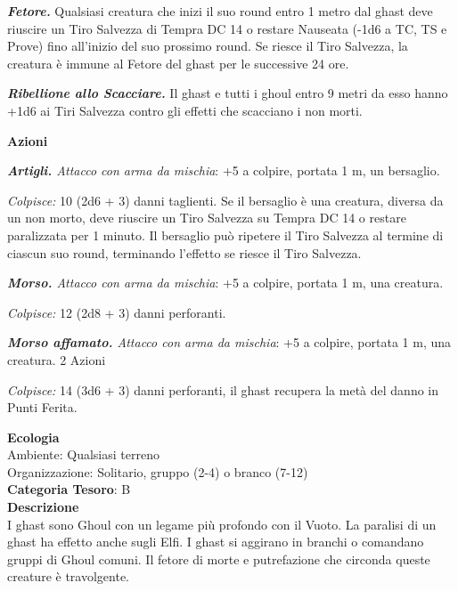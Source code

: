 \begin{multicols}{2}
{\emph{\textbf{Fetore.}} Qualsiasi creatura che inizi il suo round entro 1 metro dal ghast deve riuscire un Tiro Salvezza di Tempra DC 14 o restare Nauseata (-1d6 a TC, TS e Prove) fino all'inizio del suo prossimo round. Se riesce il Tiro Salvezza, la creatura è immune al Fetore del ghast per le successive 24 ore.

\emph{\textbf{Ribellione allo Scacciare.}} Il ghast e tutti i ghoul entro 9 metri da esso hanno +1d6 ai Tiri Salvezza contro gli effetti che scacciano i non morti.

\textbf{Azioni}

\emph{\textbf{Artigli.} Attacco con arma da mischia}: +5 a colpire, portata 1 m, un bersaglio.

\emph{Colpisce:} 10 (2d6 + 3) danni taglienti. Se il bersaglio è una creatura, diversa da un non morto, deve riuscire un Tiro Salvezza su Tempra DC 14 o restare paralizzata per 1 minuto. Il bersaglio può ripetere il Tiro Salvezza al termine di ciascun suo round, terminando l'effetto se riesce il Tiro Salvezza.

\emph{\textbf{Morso.} Attacco con arma da mischia}: +5 a colpire, portata 1 m, una creatura.

\emph{Colpisce:} 12 (2d8 + 3) danni perforanti.

\emph{\textbf{Morso affamato.} Attacco con arma da mischia}: +5 a colpire, portata 1 m, una creatura. 2 Azioni

\emph{Colpisce:} 14 (3d6 + 3) danni perforanti, il ghast recupera la metà del danno in Punti Ferita.

\textbf{Ecologia}\\
Ambiente: Qualsiasi terreno\\
Organizzazione: Solitario, gruppo (2-4) o branco (7-12)\\
\textbf{Categoria Tesoro}: B\\
\textbf{Descrizione}\\
I ghast sono Ghoul con un legame più profondo con il Vuoto. La paralisi di un ghast ha effetto anche sugli Elfi. I ghast si aggirano in branchi o comandano gruppi di Ghoul comuni. Il fetore di morte e putrefazione che circonda queste creature è travolgente.

}
\end{multicols}
